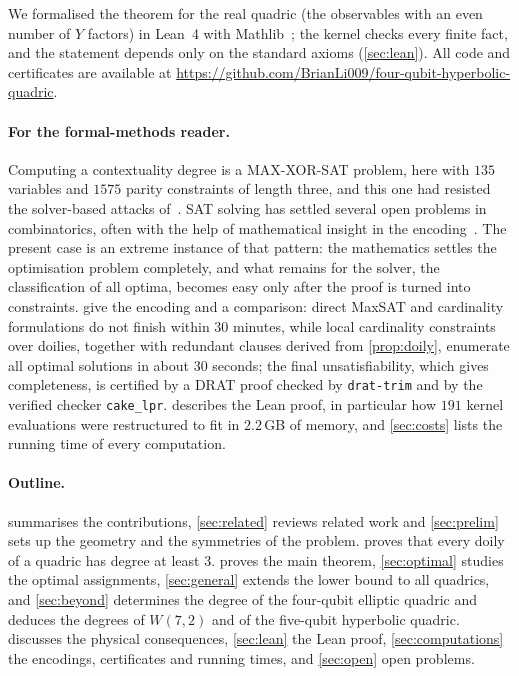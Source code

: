 \documentclass[11pt]{article}
\theoremstyle{definition}
\theoremstyle{remark}
\newcommand{\repo}{\url{https://github.com/BrianLi009/four-qubit-hyperbolic-quadric}}
\begin{document}
We formalised the theorem for the real quadric (the observables with an even number of $Y$ factors) in Lean~4 with Mathlib~\cite{Lean4,Mathlib}; the kernel checks every finite fact, and the statement depends only on the standard axioms (\cref{sec:lean}).
All code and certificates are available at \repo.

\paragraph{For the formal-methods reader.}
Computing a contextuality degree is a MAX-XOR-SAT problem, here with $135$ variables and $1575$ parity constraints of length three, and this one had resisted the solver-based attacks of~\cite{Muller23,Muller24}.
SAT solving has settled several open problems in combinatorics, often with the help of mathematical insight in the encoding~\cite{Heule16,Zulkoski15}.
The present case is an extreme instance of that pattern: the mathematics settles the optimisation problem completely, and what remains for the solver, the classification of all optima, becomes easy only after the proof is turned into constraints.
 give the encoding and a comparison: direct MaxSAT and cardinality formulations do not finish within $30$ minutes, while local cardinality constraints over doilies, together with redundant clauses derived from \cref{prop:doily}, enumerate all optimal solutions in about $30$ seconds; the final unsatisfiability, which gives completeness, is certified by a DRAT proof checked by \texttt{drat-trim} and by the verified checker \texttt{cake\_lpr}.
 describes the Lean proof, in particular how $191$ kernel evaluations were restructured to fit in $2.2$\,GB of memory, and \cref{sec:costs} lists the running time of every computation.

\paragraph{Outline.}
 summarises the contributions, \cref{sec:related} reviews related work and \cref{sec:prelim} sets up the geometry and the symmetries of the problem.
 proves that every doily of a quadric has degree at least $3$.
 proves the main theorem, \cref{sec:optimal} studies the optimal assignments, \cref{sec:general} extends the lower bound to all quadrics, and \cref{sec:beyond} determines the degree of the four-qubit elliptic quadric and deduces the degrees of $W(7,2)$ and of the five-qubit hyperbolic quadric.
 discusses the physical consequences, \cref{sec:lean} the Lean proof, \cref{sec:computations} the encodings, certificates and running times, and \cref{sec:open} open problems.
\end{document}
